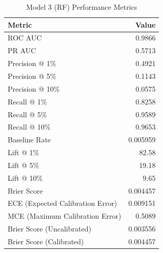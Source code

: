 \begin{table}[h]
\centering
\begin{tabular}{lr}
\toprule
Metric & Value \\
\midrule
ROC AUC & 0.9866 \\
PR AUC & 0.5713 \\
Precision @ 1\% & 0.4921 \\
Precision @ 5\% & 0.1143 \\
Precision @ 10\% & 0.0575 \\
Recall @ 1\% & 0.8258 \\
Recall @ 5\% & 0.9589 \\
Recall @ 10\% & 0.9653 \\
Baseline Rate & 0.005959 \\
Lift @ 1\% & 82.58 \\
Lift @ 5\% & 19.18 \\
Lift @ 10\% & 9.65 \\
Brier Score & 0.004457 \\
ECE (Expected Calibration Error) & 0.009151 \\
MCE (Maximum Calibration Error) & 0.5089 \\
Brier Score (Uncalibrated) & 0.003556 \\
Brier Score (Calibrated) & 0.004457 \\
\bottomrule
\end{tabular}
\caption{Model 3 (RF) Performance Metrics}
\label{tab:model3_rf_metrics}
\end{table}
